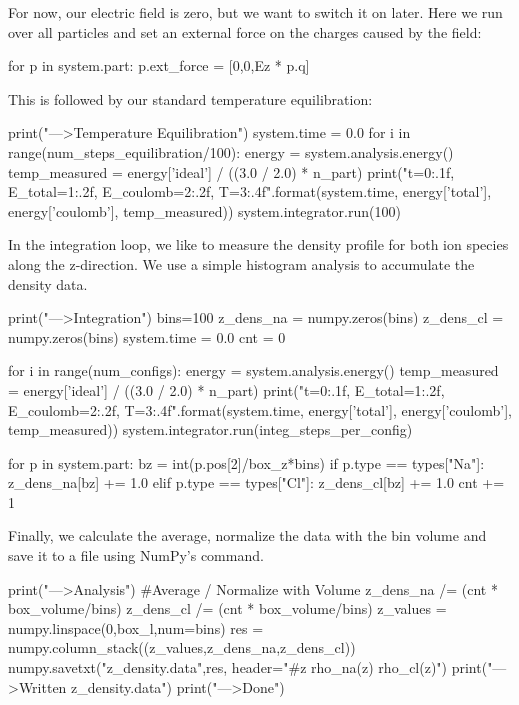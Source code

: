 \documentclass[
a4paper,                        %
11pt,                           %
twoside,                        %
footsepline,                    %
headsepline,                    %
headexclude,                    %
footexclude,                    %
pagesize,                       %
]{scrartcl}
\begin{document}
For now, our electric field is zero, but we want to switch it on later.
Here we run over all particles and set an external force on the charges caused 
by the field:

\begin{pypresso}
for p in system.part:
    p.ext_force = [0,0,Ez * p.q]
\end{pypresso}

This is followed by our standard temperature equilibration:

\begin{pypresso}
print("\n--->Temperature Equilibration")
system.time = 0.0
for i in range(num_steps_equilibration/100):
    energy = system.analysis.energy()
    temp_measured = energy['ideal'] / ((3.0 / 2.0) * n_part)
    print("t={0:.1f}, E_total={1:.2f}, E_coulomb={2:.2f},
          T={3:.4f}".format(system.time, energy['total'],
          energy['coulomb'], temp_measured))
    system.integrator.run(100)
\end{pypresso}

In the integration loop, we like to measure the density profile for both ion species along the z-direction.
We use a simple histogram analysis to accumulate the density data.

\begin{pypresso}
print("\n--->Integration")
bins=100
z_dens_na = numpy.zeros(bins)
z_dens_cl = numpy.zeros(bins)
system.time = 0.0
cnt = 0

for i in range(num_configs):
    energy = system.analysis.energy()
    temp_measured = energy['ideal'] / ((3.0 / 2.0) * n_part)
    print("t={0:.1f}, E_total={1:.2f}, E_coulomb={2:.2f},
          T={3:.4f}".format(system.time, energy['total'],
          energy['coulomb'], temp_measured))
    system.integrator.run(integ_steps_per_config)

    for p in system.part:
        bz = int(p.pos[2]/box_z*bins)
        if p.type == types["Na"]:
            z_dens_na[bz] += 1.0
        elif p.type == types["Cl"]:
            z_dens_cl[bz] += 1.0
    cnt += 1
\end{pypresso}

Finally, we calculate the average, normalize the data with the bin volume and save it to
a file using NumPy's  command.

\begin{pypresso}
print("\n--->Analysis")
#Average / Normalize with Volume
z_dens_na /= (cnt * box_volume/bins)
z_dens_cl /= (cnt * box_volume/bins)
z_values = numpy.linspace(0,box_l,num=bins)
res = numpy.column_stack((z_values,z_dens_na,z_dens_cl))
numpy.savetxt("z_density.data",res,
        header="#z rho_na(z) rho_cl(z)")
print("\n--->Written z_density.data")
print("\n--->Done")
\end{pypresso}
\end{document}
